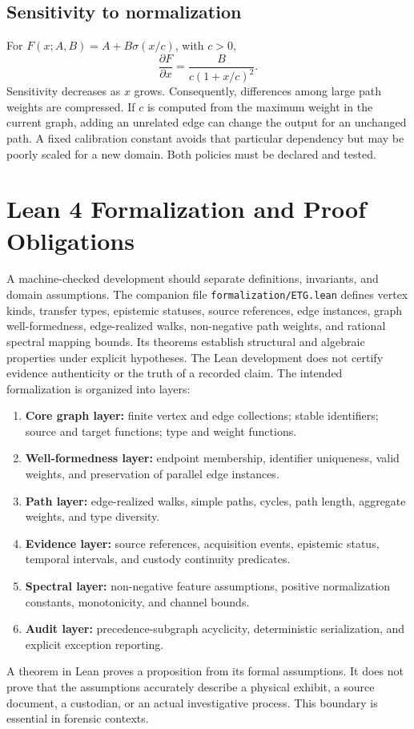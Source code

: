 \documentclass[11pt]{article}
\begin{document}
\subsection{Sensitivity to normalization}
For $F(x;A,B)=A+B\sigma(x/c)$, with $c>0$,
\[
\frac{\partial F}{\partial x}
=\frac{B}{c(1+x/c)^2}.
\]
Sensitivity decreases as $x$ grows. Consequently, differences among large path weights are compressed. If $c$ is computed from the maximum weight in the current graph, adding an unrelated edge can change the output for an unchanged path. A fixed calibration constant avoids that particular dependency but may be poorly scaled for a new domain. Both policies must be declared and tested.
\section{Lean 4 Formalization and Proof Obligations}
A machine-checked development should separate definitions, invariants, and domain assumptions. The companion file \texttt{formalization/ETG.lean} defines vertex kinds, transfer types, epistemic statuses, source references, edge instances, graph well-formedness, edge-realized walks, non-negative path weights, and rational spectral mapping bounds. Its theorems establish structural and algebraic properties under explicit hypotheses. The Lean development does not certify evidence authenticity or the truth of a recorded claim.
The intended formalization is organized into layers:
\begin{enumerate}
\item \textbf{Core graph layer:} finite vertex and edge collections; stable identifiers; source and target functions; type and weight functions.
\item \textbf{Well-formedness layer:} endpoint membership, identifier uniqueness, valid weights, and preservation of parallel edge instances.
\item \textbf{Path layer:} edge-realized walks, simple paths, cycles, path length, aggregate weights, and type diversity.
\item \textbf{Evidence layer:} source references, acquisition events, epistemic status, temporal intervals, and custody continuity predicates.
\item \textbf{Spectral layer:} non-negative feature assumptions, positive normalization constants, monotonicity, and channel bounds.
\item \textbf{Audit layer:} precedence-subgraph acyclicity, deterministic serialization, and explicit exception reporting.
\end{enumerate}
A theorem in Lean proves a proposition from its formal assumptions. It does not prove that the assumptions accurately describe a physical exhibit, a source document, a custodian, or an actual investigative process. This boundary is essential in forensic contexts.
\end{document}
